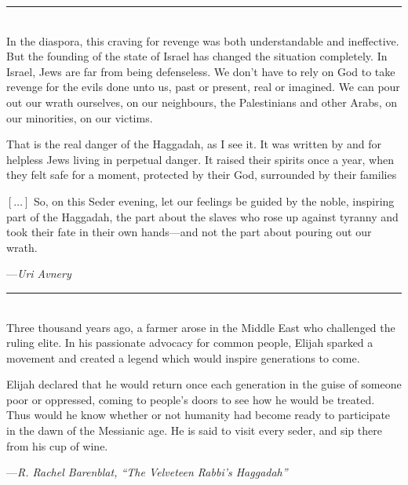 \documentclass[letter,11pt,openany]{memoir}
\newcommand{\HgEllipsis}{\ensuremath{\left[\ldots\right]}}
\newcommand{\HgSource}[1]{\hfill{\small---\itshape{#1}}}
\newcommand{\HgFill}{\vfill \hrule \vfill}
\newenvironment{HgEnglish}{\strut\\\noindent}{\vspace{1em}}
\begin{document}
\HgFill

\begin{HgEnglish}
   In the diaspora, this craving for revenge was both understandable and
   ineffective. But the founding of the state of Israel has changed the
   situation completely. In Israel, Jews are far from being defenseless. We
   don’t have to rely on God to take revenge for the evils done unto us, past or
   present, real or imagined. We can pour out our wrath ourselves, on our
   neighbours, the Palestinians and other Arabs, on our minorities, on our
   victims.

   That is the real danger of the Haggadah, as I see it. It was written by and
   for helpless Jews living in perpetual danger. It raised their spirits once a
   year, when they felt safe for a moment, protected by their God, surrounded by
   their families


   \HgEllipsis{} So, on this Seder evening, let our feelings be guided by the
   noble, inspiring part of the Haggadah, the part about the slaves who rose up
   against tyranny and took their fate in their own hands---and not the part
   about pouring out our wrath.

   \HgSource{Uri Avnery}
\end{HgEnglish}

\HgFill

\begin{HgEnglish}
Three thousand years ago, a farmer arose in the Middle East who challenged the
ruling elite. In his passionate advocacy for common people, Elijah sparked a
movement and created a legend which would inspire generations to come.

Elijah declared that he would return once each generation in the guise of
someone poor or oppressed, coming to people's doors to see how he would be
treated. Thus would he know whether or not humanity had become ready to
participate in the dawn of the Messianic age. He is said to visit every seder,
and sip there from his cup of wine.

\HgSource{R. Rachel Barenblat, ``The Velveteen Rabbi's Haggadah''}
\end{HgEnglish}
\end{document}
